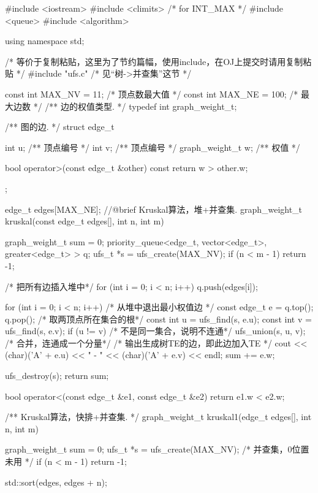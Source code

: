 \begin{Codex}[label=kruskal.cpp]
    #include <iostream>
    #include <climits>  /* for INT_MAX */
    #include <queue>
    #include <algorithm>

    using namespace std;

    /* 等价于复制粘贴，这里为了节约篇幅，使用include，在OJ上提交时请用复制粘贴 */
    #include "ufs.c"  /* 见“树->并查集”这节 */

    const int MAX_NV = 11; /* 顶点数最大值 */
    const int MAX_NE = 100;  /* 最大边数 */
    /** 边的权值类型. */
    typedef int graph_weight_t;

    /** 图的边. */
    struct edge_t{
        int u;  /** 顶点编号 */
        int v;  /** 顶点编号 */
        graph_weight_t w;  /** 权值 */

        bool operator>(const edge_t &other) const {
            return w > other.w;
        }
    };

    edge_t edges[MAX_NE];
    //@brief Kruskal算法，堆+并查集.
    graph_weight_t kruskal(const edge_t edges[], int n, int m) {
        graph_weight_t sum = 0;
        priority_queue<edge_t, vector<edge_t>,
                                    greater<edge_t> > q;
        ufs_t *s = ufs_create(MAX_NV);
        if (n < m - 1) return -1;

        /* 把所有边插入堆中*/
        for (int i = 0; i < n; i++) {
            q.push(edges[i]);
        }

        for (int i = 0; i < n; i++) {
            /* 从堆中退出最小权值边 */
            const edge_t e = q.top(); q.pop();
            /* 取两顶点所在集合的根*/
            const int u = ufs_find(s, e.u);
            const int v = ufs_find(s, e.v);
            if (u != v) { /* 不是同一集合，说明不连通*/
                ufs_union(s, u, v); /* 合并，连通成一个分量*/
                /* 输出生成树TE的边，即此边加入TE */
                cout << (char)('A' + e.u) << " - " << (char)('A' + e.v) << endl;
                sum += e.w;
            }
        }

        ufs_destroy(s);
        return sum;
    }

    bool operator<(const edge_t &e1, const edge_t &e2) {
        return e1.w < e2.w;
    }

    /** Kruskal算法，快排+并查集. */
    graph_weight_t kruskal1(edge_t edges[], int n, int m) {
        graph_weight_t sum = 0;
        ufs_t *s = ufs_create(MAX_NV);  /* 并查集，0位置未用  */
        if (n < m - 1) return -1;

        std::sort(edges, edges + n);

}
\end{Codex}
